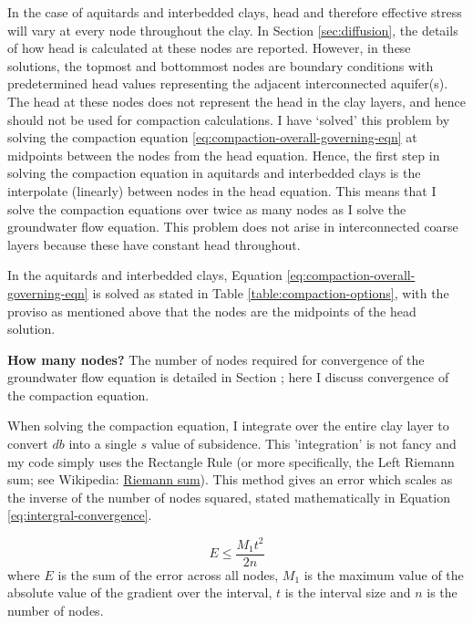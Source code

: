 \documentclass{article}
\begin{document}
In the case of aquitards and interbedded clays, head and therefore effective stress will vary at every node throughout the clay. In Section \ref{sec:diffusion}, the details of how head is calculated at these nodes are reported. However, in these solutions, the topmost and bottommost nodes are boundary conditions with predetermined head values representing the adjacent interconnected aquifer(s). The head at these nodes does not represent the head in the clay layers, and hence should not be used for compaction calculations. I have `solved' this problem by solving the compaction equation \ref{eq:compaction-overall-governing-eqn} at midpoints between the nodes from the head equation. Hence, the first step in solving the compaction equation in aquitards and interbedded clays is the interpolate (linearly) between nodes in the head equation. This means that I solve the compaction equations over twice as many nodes as I solve the groundwater flow equation. This problem does not arise in interconnected coarse layers because these have constant head throughout.

In the aquitards and interbedded clays, Equation \ref{eq:compaction-overall-governing-eqn} is solved as stated in Table \ref{table:compaction-options}, with the proviso as mentioned above that the nodes are the midpoints of the head solution. 

\textbf{How many nodes?}
The number of nodes required for convergence of the groundwater flow equation is detailed in Section \label{sec:Convergence_gwflow}; here I discuss convergence of the compaction equation.

When solving the compaction equation, I integrate over the entire clay layer to convert $ db $ into a single $ s $ value of subsidence. This 'integration' is not fancy and my code simply uses the Rectangle Rule (or more specifically, the Left Riemann sum; see Wikipedia: \href{https://en.wikipedia.org/wiki/Riemann_sum#Left_Riemann_sum}{Riemann sum}). This method gives an error which scales as the inverse of the number of nodes squared, stated mathematically in Equation \ref{eq:intergral-convergence}.

\begin{equation}
E \leq  \frac{M_1 t^2}{2n}
\label{eq:intergral-convergence}
\end{equation}
where $E$ is the sum of the error across all nodes, $M_1$ is the maximum value of the absolute value of the gradient over the interval, $t$ is the interval size and $n$ is the number of nodes. 
\end{document}
